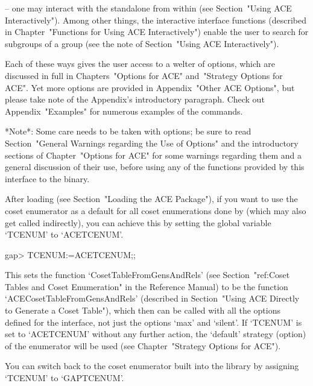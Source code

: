 \item{--} one may interact with  the  {\ACE}  standalone  from  within
{\GAP} (see Section~"Using ACE Interactively").  Among  other  things,
the   interactive   {\ACE}   interface   functions    (described    in
Chapter~"Functions for Using ACE Interactively") enable  the  user  to
search for subgroups of a group (see the note  of  Section~"Using  ACE
Interactively").

\endlist

Each of these ways gives the user access to a welter of options, which
are discussed in full  in  Chapters~"Options  for  ACE"  and~"Strategy
Options for ACE". Yet more options are provided in Appendix~"Other ACE
Options",  but  please  take  note  of  the  Appendix's   introductory
paragraph. Check out Appendix~"Examples" for numerous examples of  the
{\ACE} commands.

*Note*: Some care needs to be taken with  options;  be  sure  to  read
Section~"General Warnings  regarding  the  Use  of  Options"  and  the
introductory sections of Chapter~"Options for ACE" for  some  warnings
regarding them and a general discussion of their use, before using any
of the functions provided by this interface to the {\ACE} binary.


After loading {\ACE} (see Section~"Loading the ACE Package"),  if  you
want to use the {\ACE} coset enumerator as a  default  for  all  coset
enumerations done by {\GAP} (which may also  get  called  indirectly),
you can achieve this  by  setting  the  global  variable  `TCENUM'  to
`ACETCENUM'.

\beginexample
gap> TCENUM:=ACETCENUM;;
\endexample

This    sets    the    function    `CosetTableFromGensAndRels'    (see
Section~"ref:Coset  Tables  and  Coset  Enumeration"  in  the   {\GAP}
Reference Manual) to be  the  function  `ACECosetTableFromGensAndRels'
(described in Section~"Using ACE Directly to Generate a Coset Table"),
which then can be called with all the options defined for  the  {\ACE}
interface, not just the options `max' and `silent'. If `TCENUM' is set
to `ACETCENUM' without any  further  action,  the  `default'  strategy
(option) of the {\ACE} enumerator will be used (see  Chapter~"Strategy
Options for ACE").

You can switch back to the coset  enumerator  built  into  the  {\GAP}
library by assigning `TCENUM' to `GAPTCENUM'.

